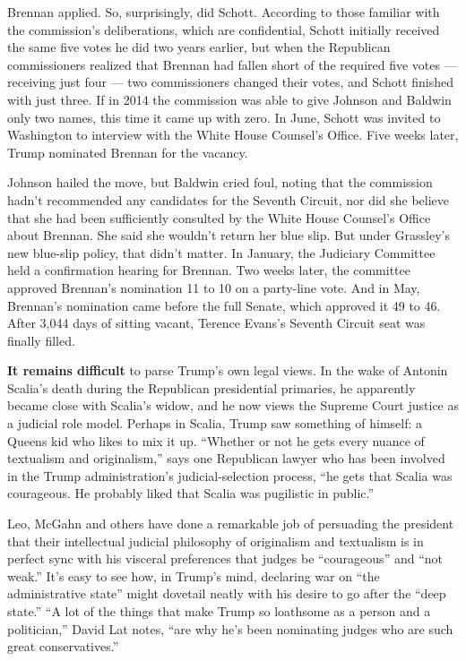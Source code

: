 Brennan applied. So, surprisingly, did Schott. According to those
familiar with the commission's deliberations, which are confidential,
Schott initially received the same five votes he did two years earlier,
but when the Republican commissioners realized that Brennan had fallen
short of the required five votes --- receiving just four --- two
commissioners changed their votes, and Schott finished with just three.
If in 2014 the commission was able to give Johnson and Baldwin only two
names, this time it came up with zero. In June, Schott was invited to
Washington to interview with the White House Counsel's Office. Five
weeks later, Trump nominated Brennan for the vacancy.

Johnson hailed the move, but Baldwin cried foul, noting that the
commission hadn't recommended any candidates for the Seventh Circuit,
nor did she believe that she had been sufficiently consulted by the
White House Counsel's Office about Brennan. She said she wouldn't return
her blue slip. But under Grassley's new blue-slip policy, that didn't
matter. In January, the Judiciary Committee held a confirmation hearing
for Brennan. Two weeks later, the committee approved Brennan's
nomination 11 to 10 on a party-line vote. And in May, Brennan's
nomination came before the full Senate, which approved it 49 to 46.
After 3,044 days of sitting vacant, Terence Evans's Seventh Circuit seat
was finally filled.

\textbf{It remains difficult} to parse Trump's own legal views. In the
wake of Antonin Scalia's death during the Republican presidential
primaries, he apparently became close with Scalia's widow, and he now
views the Supreme Court justice as a judicial role model. Perhaps in
Scalia, Trump saw something of himself: a Queens kid who likes to mix it
up. ``Whether or not he gets every nuance of textualism and
originalism,'' says one Republican lawyer who has been involved in the
Trump administration's judicial-selection process, ``he gets that Scalia
was courageous. He probably liked that Scalia was pugilistic in
public.''

Leo, McGahn and others have done a remarkable job of persuading the
president that their intellectual judicial philosophy of originalism and
textualism is in perfect sync with his visceral preferences that judges
be ``courageous'' and ``not weak.'' It's easy to see how, in Trump's
mind, declaring war on ``the administrative state'' might dovetail
neatly with his desire to go after the ``deep state.'' ``A lot of the
things that make Trump so loathsome as a person and a politician,''
David Lat notes, ``are why he's been nominating judges who are such
great conservatives.''


